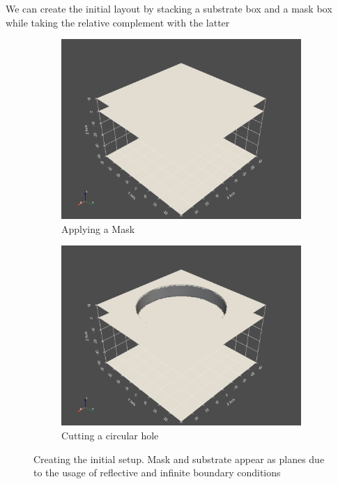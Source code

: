 We can create the initial layout by stacking a substrate box and a mask box while taking the relative complement with the latter
\begin{figure}[h]
    \begin{subfigure}{0.45\textwidth}
    \includegraphics[width=1\linewidth]{res/task2.2_mask.png} 
    \caption{Applying a Mask}
    \label{fig:serial-solution}
    
\end{subfigure}
    \begin{subfigure}{0.45\textwidth}
    \includegraphics[width=1\linewidth]{res/task2.2_circularHole.png}
    \caption{Cutting a circular hole}
    \label{fig:parallel-solution}
\end{subfigure}

\caption{Creating the initial setup. Mask and substrate appear as planes due to the usage of reflective and infinite boundary conditions}
\label{fig:serial-vs-parallel}
\end{figure}


